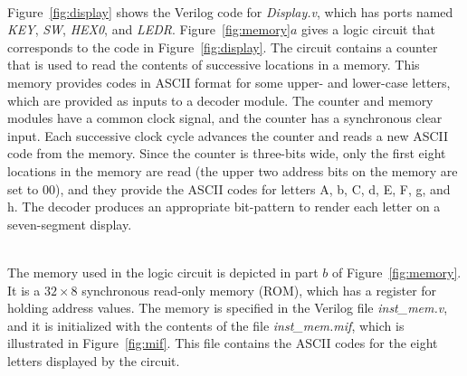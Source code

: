 \documentclass[epsfig,10pt,fullpage]{article} \addtolength{\textwidth}{1.5in}
\begin{document}
~\\
Figure~\ref{fig:display} shows the Verilog code for {\it Display.v}, which 
has ports named {\it KEY}, {\it SW}, {\it HEX0}, and {\it LEDR}.
Figure~\ref{fig:memory}$a$ gives a logic circuit that corresponds to the code in 
Figure~\ref{fig:display}. The circuit contains a counter that is used to read the 
contents of successive locations in a memory. This memory provides codes in ASCII format 
for some upper- and lower-case letters, which are provided as inputs to a decoder module. 
The counter and memory modules have a common clock signal, and the counter has a
synchronous clear input. Each successive clock cycle advances the counter and reads 
a new ASCII code from the memory. Since the counter is three-bits wide, only the first 
eight locations in the memory are read (the upper two address bits on the memory are set
to 00), and they provide the ASCII codes for letters A, b, C, d, E, F, g, and h. The 
decoder produces an appropriate bit-pattern to render each letter on a seven-segment display.

~\\
\noindent
The memory used in the logic circuit is depicted in part $b$ of Figure~\ref{fig:memory}. It
is a $32 \times 8$ synchronous read-only memory (ROM), which has a register for holding 
address values. The memory is specified in the Verilog file {\it inst\_mem.v}, and it is 
initialized with the contents of the file {\it inst\_mem.mif},
which is illustrated in Figure~\ref{fig:mif}. This file contains the ASCII codes for the 
eight letters displayed by the circuit.
\end{document}
